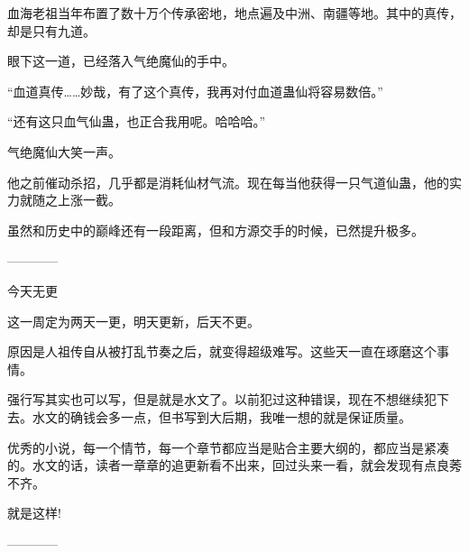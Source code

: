 \begin{this_body}
血海老祖当年布置了数十万个传承密地，地点遍及中洲、南疆等地。其中的真传，却是只有九道。

眼下这一道，已经落入气绝魔仙的手中。

“血道真传……妙哉，有了这个真传，我再对付血道蛊仙将容易数倍。”

“还有这只血气仙蛊，也正合我用呢。哈哈哈。”

气绝魔仙大笑一声。

他之前催动杀招，几乎都是消耗仙材气流。现在每当他获得一只气道仙蛊，他的实力就随之上涨一截。

虽然和历史中的巅峰还有一段距离，但和方源交手的时候，已然提升极多。

------------

今天无更

这一周定为两天一更，明天更新，后天不更。

原因是人祖传自从被打乱节奏之后，就变得超级难写。这些天一直在琢磨这个事情。

强行写其实也可以写，但是就是水文了。以前犯过这种错误，现在不想继续犯下去。水文的确钱会多一点，但书写到大后期，我唯一想的就是保证质量。

优秀的小说，每一个情节，每一个章节都应当是贴合主要大纲的，都应当是紧凑的。水文的话，读者一章章的追更新看不出来，回过头来一看，就会发现有点良莠不齐。

就是这样!

------------

\end{this_body}

